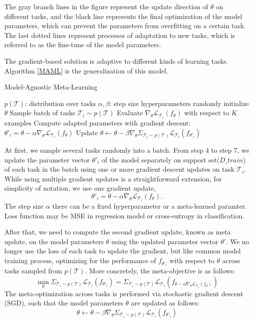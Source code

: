 The gray branch lines in the figure represent the update direction of $\theta$ on different tasks, and the black line represents the final optimization of the model parameters, which can prevent the parameters from overfitting on a certain task. The last dotted lines represent processes of adaptation to new tasks, which is referred to as the fine-tune of the model parameters.

The gradient-based solution is adaptive to different kinds of learning tasks. Algorithm \ref{MAML} is the generalization of this model.



\begin{algorithm}[h]
  \caption{Model-Agnostic Meta-Learning}
  \label{MAML}
  \begin{algorithmic}[1]
    \REQUIRE $p(\mathcal{T})$: distribution over tasks
    \REQUIRE $\alpha, \beta$: step size hyperparameters
    \STATE randomly initialize $\theta$
    \STATE Sample batch of tasks $\mathcal{T}_i \sim p(\mathcal{T})$
    \STATE Evaluate $\nabla_\theta \mathcal{L}_{\mathcal{T}_i} (f_\theta)$ with respect to $K$ examples
    \STATE Compute adapted parameters with gradient descent: $\theta'_i = \theta - \alpha\nabla_\theta \mathcal{L}_{\mathcal{T}_i} (f_\theta)$
    \ENDFOR
    \STATE Update $\theta \leftarrow \theta - \beta\nabla_\theta \Sigma_{\mathcal{T}_i \sim p(\mathcal{T})}\mathcal{L}_{\mathcal{T}_i} (f_{\theta'_i})$
    \ENDWHILE
  \end{algorithmic}
\end{algorithm}

At first, we sample several tasks randomly into a batch. From step 4 to step 7, we update the parameter vector $\theta'_i$ of the model separately on support set($D\_train$) of each task in the batch using one or more gradient descent updates on task $\mathcal{T}_i$.
While using multiple gradient updates is a straightforward extension, for simplicity of notation, we use one gradient update,
$$\theta'_i = \theta - \alpha\nabla_\theta \mathcal{L}_{\mathcal{T}_i} (f_\theta).$$
The step size $\alpha$ there can be a fixed hyperparameter or a meta-learned paramter. Loss function may be MSE in regression model or cross-entropy in classification.

After that, we need to compute the second gradient update, known as meta update, on the model parameters $\theta$ using the updated parameter vector $\theta'$. We no longer use the loss of each task to update the gradient, but like common model training process, optimizing for the performance of $f_{\theta'_i}$ with respect to $\theta$ across tasks sampled from
$p(\mathcal{T})$. More concretely, the meta-objective is as follows:
$$\min_\theta \Sigma_{\mathcal{T}_i \sim p(\mathcal{T})}\mathcal{L}_{\mathcal{T}_i} (f_{\theta'_i}) = \Sigma_{\mathcal{T}_i \sim p(\mathcal{T})}\mathcal{L}_{\mathcal{T}_i} (f_{\theta - \alpha\nabla_\theta \mathcal{L}_{\mathcal{T}_i} (f_\theta)})$$
The meta-optimization across tasks is performed via
stochastic gradient descent (SGD), such that the model parameters $\theta$ are updated as follows:
$$\theta \leftarrow \theta - \beta\nabla_\theta \Sigma_{\mathcal{T}_i \sim p(\mathcal{T})}\mathcal{L}_{\mathcal{T}_i} (f_{\theta'_i})$$

